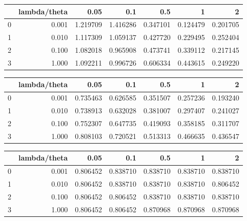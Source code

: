 \begin{tabular}{lrrrrrr}
\toprule
{} &  lambda/theta &      0.05 &       0.1 &       0.5 &         1 &         2 \\
\midrule
0 &         0.001 &  1.219709 &  1.416286 &  0.347101 &  0.124479 &  0.201705 \\
1 &         0.010 &  1.117309 &  1.059137 &  0.427720 &  0.229495 &  0.252404 \\
2 &         0.100 &  1.082018 &  0.965908 &  0.473741 &  0.339112 &  0.217145 \\
3 &         1.000 &  1.092211 &  0.996726 &  0.606334 &  0.443615 &  0.249220 \\
\bottomrule
\end{tabular}
\begin{tabular}{lrrrrrr}
\toprule
{} &  lambda/theta &      0.05 &       0.1 &       0.5 &         1 &         2 \\
\midrule
0 &         0.001 &  0.735463 &  0.626585 &  0.351507 &  0.257236 &  0.193240 \\
1 &         0.010 &  0.738913 &  0.632028 &  0.381007 &  0.297407 &  0.241027 \\
2 &         0.100 &  0.752307 &  0.647735 &  0.419093 &  0.358185 &  0.311707 \\
3 &         1.000 &  0.808103 &  0.720521 &  0.513313 &  0.466635 &  0.436547 \\
\bottomrule
\end{tabular}
\begin{tabular}{lrrrrrr}
\toprule
{} &  lambda/theta &      0.05 &       0.1 &       0.5 &         1 &         2 \\
\midrule
0 &         0.001 &  0.806452 &  0.838710 &  0.838710 &  0.838710 &  0.838710 \\
1 &         0.010 &  0.806452 &  0.838710 &  0.838710 &  0.838710 &  0.806452 \\
2 &         0.100 &  0.806452 &  0.806452 &  0.838710 &  0.838710 &  0.838710 \\
3 &         1.000 &  0.806452 &  0.806452 &  0.870968 &  0.870968 &  0.870968 \\
\bottomrule
\end{tabular}

